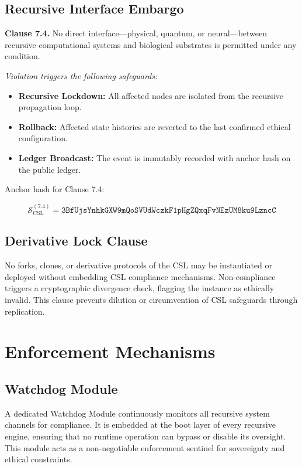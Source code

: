 \documentclass[12pt]{article}
\begin{document}
\begin{itemize}
\subsection{Recursive Interface Embargo}

\textbf{Clause 7.4.} No direct interface—physical, quantum, or neural—between recursive computational systems and biological substrates is permitted under any condition.

\textit{Violation triggers the following safeguards:}

\begin{itemize}
    \item \textbf{Recursive Lockdown:} All affected nodes are isolated from the recursive propagation loop.
    \item \textbf{Rollback:} Affected state histories are reverted to the last confirmed ethical configuration.
    \item \textbf{Ledger Broadcast:} The event is immutably recorded with anchor hash on the public ledger.
\end{itemize}

Anchor hash for Clause 7.4:

\[
\mathcal{S}_{\text{CSL}}^{(7.4)} = \texttt{3BfUjsYnhkGXW9mQoSVUdWczkF1pHgZQxqFvNEzUM8ku9LzncC}
\]

\subsection{Derivative Lock Clause}

No forks, clones, or derivative protocols of the CSL may be instantiated or deployed without embedding CSL compliance mechanisms. Non-compliance triggers a cryptographic divergence check, flagging the instance as ethically invalid. This clause prevents dilution or circumvention of CSL safeguards through replication.

\section{Enforcement Mechanisms}

\subsection{Watchdog Module}

A dedicated Watchdog Module continuously monitors all recursive system channels for compliance. It is embedded at the boot layer of every recursive engine, ensuring that no runtime operation can bypass or disable its oversight. This module acts as a non-negotiable enforcement sentinel for sovereignty and ethical constraints.


\end{itemize}
\end{document}
